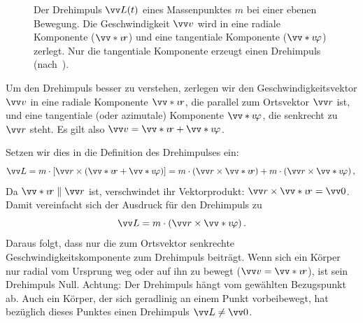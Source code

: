 \begin{figure}[htbp]
{%
    }
    \caption[Der Drehimpuls $\protect\ivec{L}(t)$ eines Massenpunktes $m$ bei einer ebenen Bewegung.]{Der Drehimpuls $\protect\ivec{L}(t)$ eines Massenpunktes $m$ bei einer ebenen Bewegung. Die Geschwindigkeit $\protect\ivec{v}$ wird in eine radiale Komponente ($\protect\ivecS{v}{r}$) und eine tangentiale Komponente ($\protect\ivecS{v}{\varphi}$) zerlegt. Nur die tangentiale Komponente erzeugt einen Drehimpuls (nach~\cite[S.~61]{Demtroeder2018}).}\label{fig: drehimpuls_ebene_bewegung}
\end{figure}
Um den Drehimpuls besser zu verstehen, zerlegen wir den Geschwindigkeitsvektor $\ivec{v}$ in eine radiale Komponente $\ivecS{v}{r}$, die parallel zum Ortsvektor $\ivec{r}$ ist, und eine tangentiale (oder azimutale) Komponente $\ivecS{v}{\varphi}$, die senkrecht zu $\ivec{r}$ steht. Es gilt also $\ivec{v} = \ivecS{v}{r} + \ivecS{v}{\varphi}$.

Setzen wir dies in die Definition des Drehimpulses ein:
\begin{equation}
\label{eq: drehimpuls_komponenten}
\ivec{L} = m \cdot [\ivec{r} \times (\ivecS{v}{r} + \ivecS{v}{\varphi})] = m \cdot (\ivec{r} \times \ivecS{v}{r}) + m \cdot (\ivec{r} \times \ivecS{v}{\varphi}) \mComma
\end{equation}
Da $\ivecS{v}{r} \parallel \ivec{r}$ ist, verschwindet ihr Vektorprodukt: $\ivec{r} \times \ivecS{v}{r} = \ivec{0}$. Damit vereinfacht sich der Ausdruck für den Drehimpuls zu
\begin{equation}
\label{eq: drehimpuls_tangential}
\ivec{L} = m \cdot (\ivec{r} \times \ivecS{v}{\varphi}) \mDot
\end{equation}
Daraus folgt, dass nur die zum Ortsvektor senkrechte Geschwindigkeitskomponente zum Drehimpuls beiträgt. Wenn sich ein Körper nur radial vom Ursprung weg oder auf ihn zu bewegt ($\ivec{v} = \ivecS{v}{r}$), ist sein Drehimpuls Null. Achtung: Der Drehimpuls hängt vom gewählten Bezugspunkt ab. Auch ein Körper, der sich geradlinig an einem Punkt vorbeibewegt, hat bezüglich dieses Punktes einen Drehimpuls $\ivec{L} \neq \ivec{0}$.

